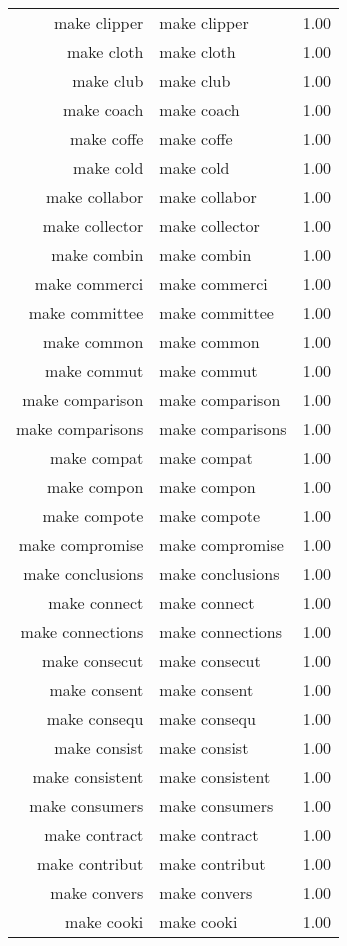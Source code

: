 \begin{table}[ht]
\begin{tabular}{rlr}
  make clipper & make clipper & 1.00 \\ 
  make cloth & make cloth & 1.00 \\ 
  make club & make club & 1.00 \\ 
  make coach & make coach & 1.00 \\ 
  make coffe & make coffe & 1.00 \\ 
  make cold & make cold & 1.00 \\ 
  make collabor & make collabor & 1.00 \\ 
  make collector & make collector & 1.00 \\ 
  make combin & make combin & 1.00 \\ 
  make commerci & make commerci & 1.00 \\ 
  make committee & make committee & 1.00 \\ 
  make common & make common & 1.00 \\ 
  make commut & make commut & 1.00 \\ 
  make comparison & make comparison & 1.00 \\ 
  make comparisons & make comparisons & 1.00 \\ 
  make compat & make compat & 1.00 \\ 
  make compon & make compon & 1.00 \\ 
  make compote & make compote & 1.00 \\ 
  make compromise & make compromise & 1.00 \\ 
  make conclusions & make conclusions & 1.00 \\ 
  make connect & make connect & 1.00 \\ 
  make connections & make connections & 1.00 \\ 
  make consecut & make consecut & 1.00 \\ 
  make consent & make consent & 1.00 \\ 
  make consequ & make consequ & 1.00 \\ 
  make consist & make consist & 1.00 \\ 
  make consistent & make consistent & 1.00 \\ 
  make consumers & make consumers & 1.00 \\ 
  make contract & make contract & 1.00 \\ 
  make contribut & make contribut & 1.00 \\ 
  make convers & make convers & 1.00 \\ 
  make cooki & make cooki & 1.00 \\ 

\end{tabular}
\end{table}

